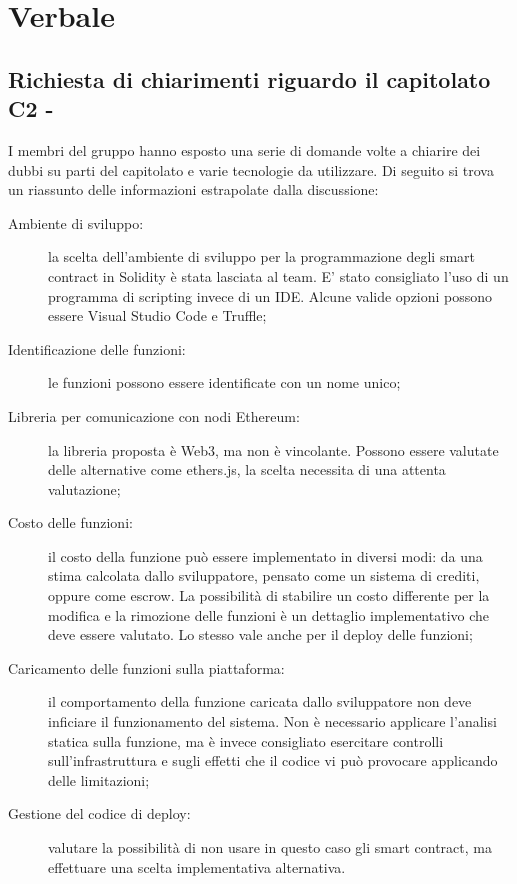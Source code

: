 \section{Verbale}
\subsection{Richiesta di chiarimenti riguardo il capitolato C2 - \NomeProgetto}
I membri del gruppo hanno esposto una serie di domande volte a chiarire dei dubbi su parti del capitolato e varie tecnologie da utilizzare.
Di seguito si trova un riassunto delle informazioni estrapolate dalla discussione:
\begin{description}
	\item[Ambiente di sviluppo:] la scelta dell'ambiente di sviluppo per la programmazione degli smart contract in Solidity è stata lasciata al team. E' stato consigliato l'uso di un programma di scripting invece di un IDE. Alcune valide opzioni possono essere Visual Studio Code e Truffle;
	\item[Identificazione delle funzioni:] le funzioni possono essere identificate con un nome unico;
	\item[Libreria per comunicazione con nodi Ethereum:] la libreria proposta è Web3, ma non è vincolante. Possono essere valutate delle alternative come ethers.js, la scelta necessita di una attenta valutazione;
	\item[Costo delle funzioni:] il costo della funzione può essere implementato in diversi modi: da una stima calcolata dallo sviluppatore, pensato come un sistema di crediti, oppure come escrow. La possibilità di stabilire un costo differente per la modifica e la rimozione delle funzioni è un  dettaglio implementativo che deve essere valutato. Lo stesso vale anche per il deploy delle funzioni;
	\item[Caricamento delle funzioni sulla piattaforma:] il comportamento della funzione caricata dallo sviluppatore non deve inficiare il funzionamento del sistema. Non è necessario applicare l'analisi statica sulla funzione, ma è invece consigliato esercitare controlli sull'infrastruttura e sugli effetti che il codice vi può provocare applicando delle limitazioni;
	\item[Gestione del codice di deploy:] valutare la possibilità di non usare in questo caso gli smart contract, ma effettuare una scelta implementativa alternativa.
\end{description}

